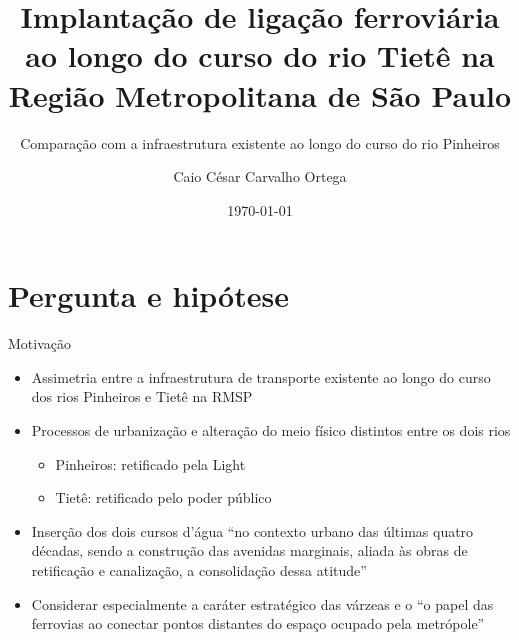 \documentclass[spectratio=43, portuguese]{beamer}
\title{Implantação de ligação ferroviária ao longo do curso do rio Tietê na Região Metropolitana de São Paulo}
\subtitle{Comparação com a infraestrutura existente ao longo do curso do rio Pinheiros}
\author{
	Caio César Carvalho Ortega\\
	}
\date{\today}
\begin{document}
\begin{frame}
\titlepage
\end{frame}
%
%
%

\section{Pergunta e hipótese}


\begin{frame}{Motivação}
	
	\begin{itemize}
		\item Assimetria entre a infraestrutura de transporte existente ao longo do curso dos rios Pinheiros e Tietê na RMSP
		\item Processos de urbanização e alteração do meio físico distintos entre os dois rios
		\begin{itemize}
			\item Pinheiros: retificado pela Light
			\item Tietê: retificado pelo poder público
		\end{itemize}
		\item Inserção dos dois cursos d'água ``no contexto urbano das últimas quatro décadas, sendo a construção das avenidas marginais, aliada às obras de retificação e canalização, a consolidação dessa atitude'' \cite[p. 43]{monteiro2010a}
		\item Considerar especialmente a caráter estratégico das várzeas \cite[p. 63]{franco2005a} e o ``o papel das ferrovias ao conectar pontos distantes do espaço ocupado pela metrópole'' \cite[p. 63]{franco2005a}
	\end{itemize}
	
\end{frame}

\end{document}
